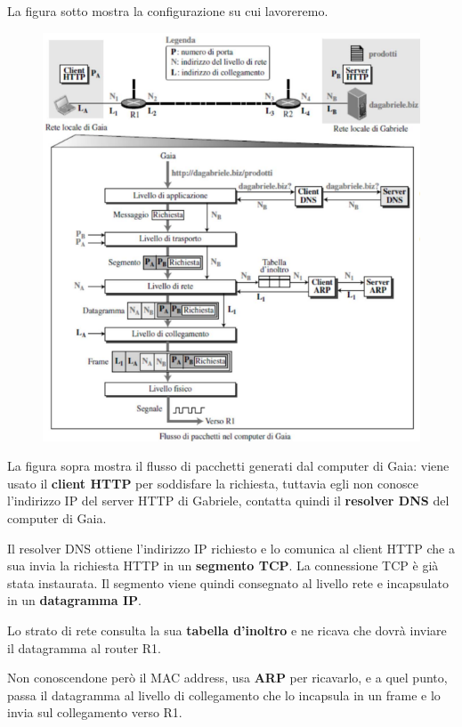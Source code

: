 \documentclass[11pt,a4paper,oneside]{book}
\theoremstyle{definition}
\begin{document}
\pagebreak

La figura sotto mostra la configurazione su cui lavoreremo.

\begin{figure}[!h]
	\includegraphics[scale=0.6]{Immagini/ARPexample.png}
	\centering
\end{figure}

La figura sopra mostra il flusso di pacchetti generati dal computer di Gaia: viene usato il \textbf{client HTTP} per soddisfare la richiesta, tuttavia egli non conosce l'indirizzo IP del server HTTP di Gabriele, contatta quindi il \textbf{resolver DNS} del computer di Gaia.

Il resolver DNS ottiene l'indirizzo IP richiesto e lo comunica al client HTTP che a sua invia la richiesta HTTP in un \textbf{segmento TCP}. La connessione TCP è già stata instaurata. Il segmento viene quindi consegnato al livello rete e incapsulato in un \textbf{datagramma IP}.

Lo strato di rete consulta la sua \textbf{tabella d'inoltro} e ne ricava che dovrà inviare il datagramma al router R1.

Non conoscendone però il MAC address, usa \textbf{ARP} per ricavarlo, e a quel punto, passa il datagramma al livello di collegamento che lo incapsula in un frame e lo invia sul collegamento verso R1.
\end{document}
